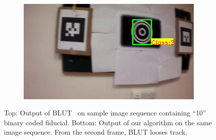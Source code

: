 \documentclass[runningheads]{llncs}
\begin{document}
\begin{figure}
\begin{subfigure}[b]{.19\textwidth}
\end{subfigure}
\begin{subfigure}[b]{.19\textwidth}
\includegraphics[width=\linewidth]{BLUT_input_10/output5.jpg}
\end{subfigure}
\caption{Top: Output of BLUT~\cite{Wu:2011} on sample image sequence containing
``10'' binary coded fiducial. Bottom: Output of our algorithm on the same image
sequence. From the second frame, BLUT looses track.}
\label{fig:BLUT_compare_10}
\end{figure}
\end{document}
